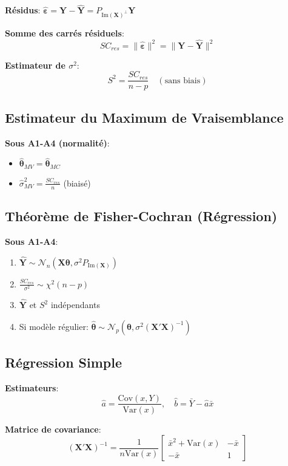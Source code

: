 \documentclass[8pt,twocolumn]{article}
\newcommand{\mydef}[1]{\textcolor{defcolor}{\textbf{#1}}}
\newcommand{\mythm}[1]{\textcolor{thmcolor}{\textbf{#1}}}
\newcommand{\myprop}[1]{\textcolor{propcolor}{\textbf{#1}}}
\newcommand{\Var}{\text{Var}}
\newcommand{\Cov}{\text{Cov}}
\begin{document}
\mydef{Résidus}: $\hat{\boldsymbol{\varepsilon}} = \mathbf{Y} - \hat{\mathbf{Y}} = P_{\text{Im}(\mathbf{X})^\perp}\mathbf{Y}$

\mydef{Somme des carrés résiduels}:
$$SC_{res} = \|\hat{\boldsymbol{\varepsilon}}\|^2 = \|\mathbf{Y} - \hat{\mathbf{Y}}\|^2$$

\mydef{Estimateur de $\sigma^2$}:
$$S^2 = \frac{SC_{res}}{n-p} \quad (\text{sans biais})$$

\subsection{Estimateur du Maximum de Vraisemblance}
\myprop{Sous A1-A4 (normalité)}:
\begin{itemize}[nosep]
\item $\hat{\boldsymbol{\theta}}_{MV} = \hat{\boldsymbol{\theta}}_{MC}$
\item $\hat{\sigma}^2_{MV} = \frac{SC_{res}}{n}$ (biaisé)
\end{itemize}

\subsection{Théorème de Fisher-Cochran (Régression)}
\mythm{Sous A1-A4}:
\begin{enumerate}[nosep]
\item $\hat{\mathbf{Y}} \sim \mathcal{N}_n(\mathbf{X}\boldsymbol{\theta}, \sigma^2 P_{\text{Im}(\mathbf{X})})$
\item $\frac{SC_{res}}{\sigma^2} \sim \chi^2(n-p)$
\item $\hat{\mathbf{Y}}$ et $S^2$ indépendants
\item Si modèle régulier: $\hat{\boldsymbol{\theta}} \sim \mathcal{N}_p(\boldsymbol{\theta}, \sigma^2(\mathbf{X}'\mathbf{X})^{-1})$
\end{enumerate}

\subsection{Régression Simple}
\myprop{Estimateurs}:
$$\hat{a} = \frac{\Cov(x,Y)}{\Var(x)},\quad \hat{b} = \bar{Y} - \hat{a}\bar{x}$$

\myprop{Matrice de covariance}:
$$(\mathbf{X}'\mathbf{X})^{-1} = \frac{1}{n\Var(x)}\begin{bmatrix}
\bar{x}^2 + \Var(x) & -\bar{x} \\
-\bar{x} & 1
\end{bmatrix}$$
\end{document}
